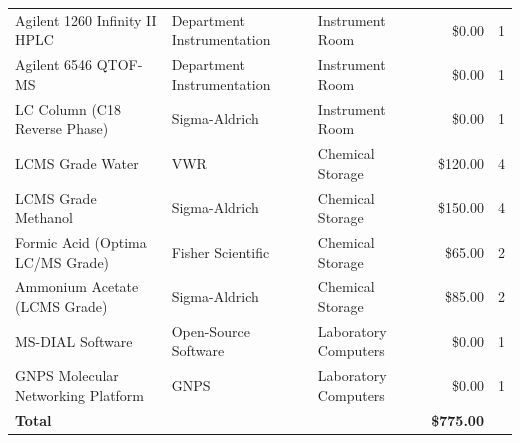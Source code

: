 \documentclass[11pt]{article}
\begin{document}
\begin{doublespace}
\begin{table}[htbp]
\begin{tabularx}{\textwidth}{@{} l X X r c @{}}
                Agilent 1260 Infinity II HPLC & Department Instrumentation & Instrument Room & \$0.00 & 1 \\
                Agilent 6546 QTOF-MS & Department Instrumentation & Instrument Room & \$0.00 & 1 \\
                LC Column (C18 Reverse Phase) & Sigma-Aldrich & Instrument Room & \$0.00 & 1 \\
                
                LCMS Grade Water & VWR & Chemical Storage & \$120.00 & 4 \\
                LCMS Grade Methanol & Sigma-Aldrich & Chemical Storage & \$150.00 & 4 \\
                
                Formic Acid (Optima LC/MS Grade) & Fisher Scientific & Chemical Storage & \$65.00 & 2 \\
                
                Ammonium Acetate (LCMS Grade) & Sigma-Aldrich & Chemical Storage & \$85.00 & 2 \\
                
                MS-DIAL Software & Open-Source Software & Laboratory Computers & \$0.00 & 1 \\
                GNPS Molecular Networking Platform & GNPS & Laboratory Computers & \$0.00 & 1 \\

                \midrule
                \textbf{Total} & & & \textbf{\$775.00} & \\
                \bottomrule
            \end{tabularx}
        \end{table}

\end{doublespace}

\newpage

\end{document}
